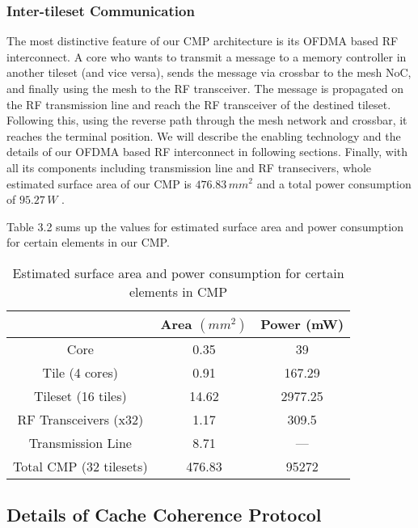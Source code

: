 \subsubsection{Inter-tileset Communication}

The most distinctive feature of our CMP architecture is its OFDMA based RF interconnect. A core who wants to transmit a message to a memory controller in another tileset (and vice versa), sends the message via crossbar to the mesh NoC, and finally using the mesh to the RF transceiver. The message is propagated on the RF transmission line and reach the RF transceiver of the destined tileset. Following this, using the reverse path through the mesh network and crossbar, it reaches the terminal position. We will describe the enabling technology and the details of our OFDMA based RF interconnect in following sections. Finally, with all its components including transmission line and RF transecivers, whole estimated surface area of our CMP is $476.83 \, mm^{2}$ and a total power consumption of $95.27 \, W$ \cite{briere2015dynamically}. 

Table 3.2 sums up the values for estimated surface area and power consumption for certain elements in our CMP.


\begin{table}[]
\centering
\caption{Estimated surface area and power consumption for certain elements in CMP}
\label{Estimated surface area and power consumption for certain elements in CMP}
\begin{tabular}{|c|c|c|}
			& Area $(mm^{2})$    & Power (mW)     \\ \hline	
Core                    & 0.35    & 39      \\ \hline
Tile (4 cores)          & 0.91    & 167.29  \\ \hline
Tileset (16 tiles)      & 14.62   & 2977.25 \\ \hline
RF Transceivers (x32)   & 1.17    & 309.5   \\ \hline
Transmission Line       & 8.71    & ---     \\ \hline
Total CMP (32 tilesets) & 476.83  & 95272   \\ \hline
\end{tabular}
\end{table}

\subsection{Details of Cache Coherence Protocol}

